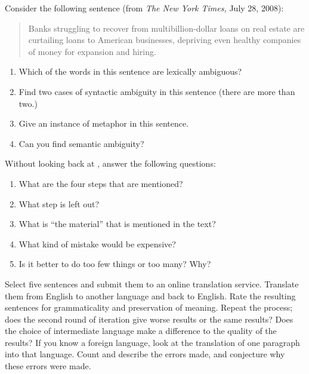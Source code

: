 \begin{exercise}
Consider the following sentence (from {\em The New York Times,} July 28, 2008):
\begin{quote}
Banks struggling to recover from multibillion-dollar loans on real estate are
curtailing loans to American businesses, depriving even healthy companies
of money for expansion and hiring.
\end{quote}
\begin{enumerate}
\item Which of the words in this sentence are lexically ambiguous?
\item Find two cases of syntactic ambiguity in this sentence (there
are more than two.)
\item Give an instance of metaphor in this sentence.
\item Can you find semantic ambiguity?
\end{enumerate}
\end{exercise} 

\begin{exercise}
Without looking back at , answer the following
questions:
\begin{enumerate}
\item What are the four steps that are mentioned?
\item What step is left out?
\item What is ``the material'' that is mentioned in the text?
\item What kind of mistake would be expensive?
\item Is it better to do too few things or too many? Why?
\end{enumerate}
\end{exercise} 




\begin{exercise}
Select five sentences and submit them to an online translation service.
Translate them from English to another
language and back to English. Rate the resulting sentences for
grammaticality and preservation of meaning.  Repeat the process; does
the second round of iteration give worse results or the same results?
Does the choice of intermediate language make a difference to the
quality of the results?
If you know a foreign language, look at the translation of one paragraph into that language.
Count and describe the errors made,
and conjecture why these errors were made.
\end{exercise} 

